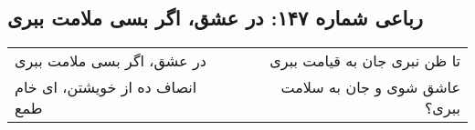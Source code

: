 \begin{center}
\section*{رباعی شماره ۱۴۷: در عشق، اگر بسی ملامت ببری}
\label{sec:147}
\begin{longtable}{l p{0.5cm} r}
در عشق، اگر بسی ملامت ببری
&&
تا ظن نبری جان به قیامت ببری
\\
انصاف ده از خویشتن، ای خام طمع
&&
عاشق شوی و جان به سلامت ببری؟
\\
\end{longtable}
\end{center}
